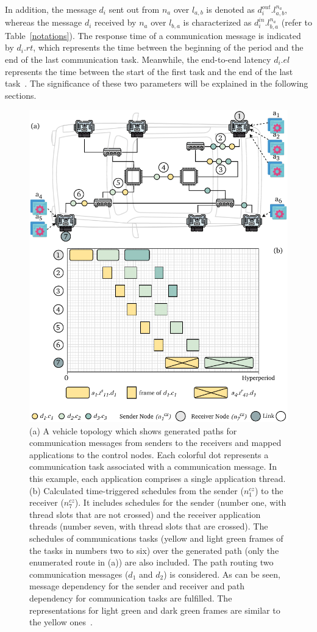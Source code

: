     In addition, the message $d_i$ sent out from $n_a$ over $l_{a,b}$ is denoted as $d_i^{out}.l_{a,b}^{n_a}$, whereas the message $d_i$ received by $n_a$ over $l_{b,a}$ is characterized as $d_i^{in}.l_{b,a}^{n_a}$ (refer to Table~\ref{notations}). The response time of a communication message is indicated by $d_i.rt$, which represents the time between the beginning of the period and the end of the last communication task. Meanwhile, the end-to-end latency $d_i.el$ represents the time between the start of the first task and the end of the last task~\cite{askaripoor2023designer}. The significance of these two parameters will be explained in the following sections.
        \begin{figure}[t!]
    	\centering
    	\includegraphics[width=0.98\columnwidth]{figures/schedules.pdf}
    	\caption{(a) A vehicle topology which shows generated paths for communication messages from senders to the receivers and mapped applications to the control nodes. Each colorful dot represents a communication task associated with a communication message. In this example, each application comprises a single application thread. (b) Calculated time-triggered schedules from the sender ($n_{1}^{cz}$) to the receiver ($n_{7}^{cz}$). It includes schedules for the sender (number one, with thread slots that are not crossed) and the receiver application threads (number seven, with thread slots that are crossed). The schedules of communications tasks (yellow and light green frames of the tasks in numbers two to six) over the generated path (only the enumerated route in (a)) are also included. The path routing two communication messages ($d_1$ and $d_2$) is considered. As can be seen, message dependency for the sender and receiver and path dependency for communication tasks are fulfilled. The representations for light green and dark green frames are similar to the yellow ones~\cite{askaripoor2023designer}.}

\end{figure}
